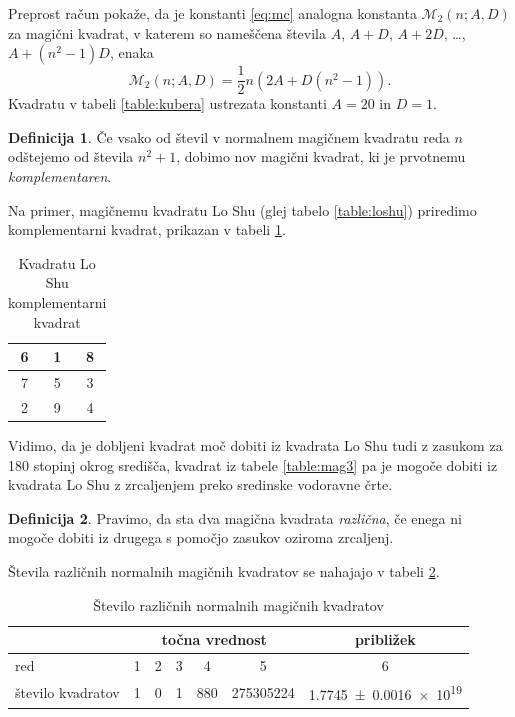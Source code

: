 \documentclass[a4paper,12pt]{article}
\newenvironment{magic}[3]
{\begin{table}[!ht]
   \centering
   \caption{#2}
   \label{#3}
   \large
   \begin{tabular}{|*{#1}{c|}}
   \hline}
{\end{tabular}
   \normalsize
\end{table}}
\newcommand{\m}{\mathcal{M}_2}
\newcommand{\pojem}[1]{\emph{\color{purple}#1}}
\theoremstyle{definition}
\newtheorem{definicija}{Definicija}
\theoremstyle{plain}
\begin{document}
Preprost račun pokaže, da je konstanti \eqref{eq:mc} analogna konstanta
\(\m(n;A,D)\) za magični kvadrat, v katerem so nameščena števila
\(A\), \(A+D\), \(A+2D\), \ldots, \(A+(n^2-1)D\), enaka
\[
   \m(n;A,D) = \frac{1}{2} n \left(2A+D(n^2-1)\right).
\]
Kvadratu v tabeli \ref{table:kubera} ustrezata konstanti \(A=20\) in \(D=1\). %

\begin{definicija}
   Če vsako od števil v normalnem magičnem kvadratu reda \(n\) odštejemo
   od števila \(n^2+1\), dobimo nov magični kvadrat, ki je prvotnemu
   \pojem{komplementaren}.
\end{definicija}

Na primer, magičnemu kvadratu Lo Shu (glej tabelo \ref{table:loshu}) priredimo
komplementarni kvadrat, prikazan v tabeli \ref{table:closhu}. %
%
\begin{magic}{3}{Kvadratu Lo Shu komplementarni kvadrat}{table:closhu}
 6 & 1 & 8 \\\hline
 7 & 5 & 3 \\\hline
 2 & 9 & 4 \\\hline
\end{magic}
%   

Vidimo, da je dobljeni kvadrat moč dobiti iz kvadrata Lo Shu tudi z zasukom za
180 stopinj okrog središča, kvadrat iz tabele \ref{table:mag3} pa je mogoče dobiti
iz kvadrata Lo Shu z zrcaljenjem preko sredinske vodoravne črte. %

\begin{definicija}
   Pravimo, da sta dva magična kvadrata \pojem{različna}, če enega ni mogoče dobiti
   iz drugega s pomočjo zasukov oziroma zrcaljenj.
\end{definicija}

Števila različnih normalnih magičnih kvadratov se nahajajo v tabeli \ref{table:stevila}.

\begin{table}[!ht]
   \centering
   \caption{Število različnih normalnih magičnih kvadratov}
   \label{table:stevila}
   \begin{tabular}{lcccccc}\toprule
      & \multicolumn{5}{c}{točna vrednost} & približek \\
      \midrule
      red & 1 & 2 & 3 & 4 & 5 & 6 \\
      število kvadratov & 1 & 0 & 1 & 880 & \num{275305224} & \num[separate-uncertainty]{1.7745 \pm 0.0016 e19} \\
      \bottomrule
   \end{tabular}
\end{table}
\end{document}
